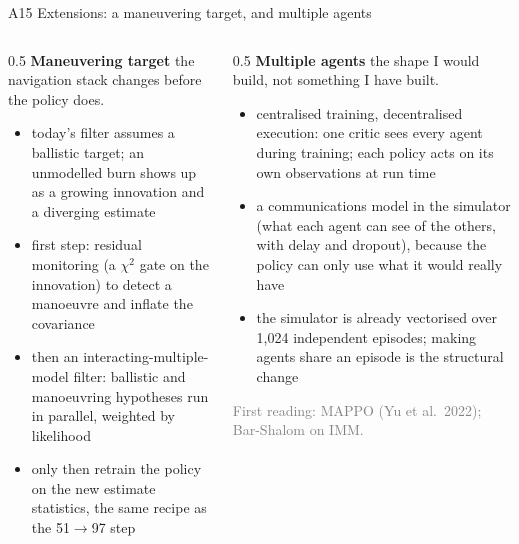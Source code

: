 \documentclass[aspectratio=169,11pt]{beamer}
\begin{document}
\begin{frame}{A15 \; Extensions: a maneuvering target, and multiple agents}
\begin{columns}[T]
\begin{column}{0.5\textwidth}\footnotesize
\textbf{Maneuvering target} \; the navigation stack changes before the policy does.
\begin{itemize}
  \item today's filter assumes a ballistic target; an unmodelled burn shows up as a growing innovation and a diverging estimate
  \item first step: residual monitoring (a $\chi^2$ gate on the innovation) to detect a manoeuvre and inflate the covariance
  \item then an interacting-multiple-model filter: ballistic and manoeuvring hypotheses run in parallel, weighted by likelihood
  \item only then retrain the policy on the new estimate statistics, the same recipe as the 51$\to$97 step
\end{itemize}
\end{column}
\begin{column}{0.5\textwidth}\footnotesize
\textbf{Multiple agents} \; the shape I would build, not something I have built.
\begin{itemize}
  \item centralised training, decentralised execution: one critic sees every agent during training; each policy acts on its own observations at run time
  \item a communications model in the simulator (what each agent can see of the others, with delay and dropout), because the policy can only use what it would really have
  \item the simulator is already vectorised over 1,024 independent episodes; making agents share an episode is the structural change
\end{itemize}
{\scriptsize\textcolor{grey}{First reading: MAPPO (Yu et al.\ 2022); Bar-Shalom on IMM.}}
\end{column}
\end{columns}
\end{frame}
\end{document}

